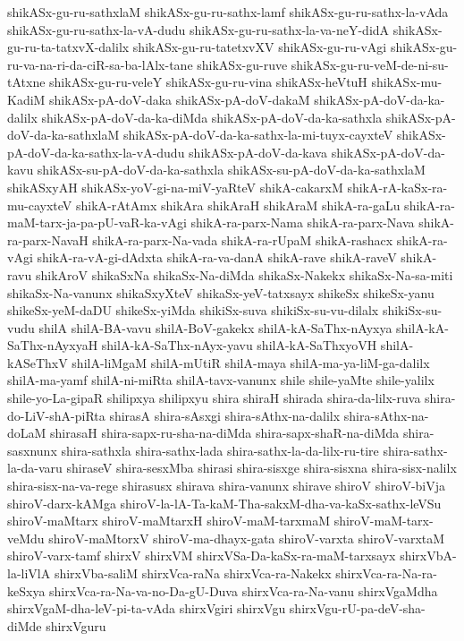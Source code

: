 {shikASx-gu-ru-sathxlaM
shikASx-gu-ru-sathx-lamf
shikASx-gu-ru-sathx-la-vAda
shikASx-gu-ru-sathx-la-vA-dudu
shikASx-gu-ru-sathx-la-va-neY-didA
shikASx-gu-ru-ta-tatxvX-dalilx
shikASx-gu-ru-tatetxvXV
shikASx-gu-ru-vAgi
shikASx-gu-ru-va-na-ri-da-ciR-sa-ba-lAlx-tane
shikASx-gu-ruve
shikASx-gu-ru-veM-de-ni-su-tAtxne
shikASx-gu-ru-veleY
shikASx-gu-ru-vina
shikASx-heVtuH
shikASx-mu-KadiM
shikASx-pA-doV-daka
shikASx-pA-doV-dakaM
shikASx-pA-doV-da-ka-dalilx
shikASx-pA-doV-da-ka-diMda
shikASx-pA-doV-da-ka-sathxla
shikASx-pA-doV-da-ka-sathxlaM
shikASx-pA-doV-da-ka-sathx-la-mi-tuyx-cayxteV
shikASx-pA-doV-da-ka-sathx-la-vA-dudu
shikASx-pA-doV-da-kava
shikASx-pA-doV-da-kavu
shikASx-su-pA-doV-da-ka-sathxla
shikASx-su-pA-doV-da-ka-sathxlaM
shikASxyAH
shikASx-yoV-gi-na-miV-yaRteV
shikA-cakarxM
shikA-rA-kaSx-ra-mu-cayxteV
shikA-rAtAmx
shikAra
shikAraH
shikAraM
shikA-ra-gaLu
shikA-ra-maM-tarx-ja-pa-pU-vaR-ka-vAgi
shikA-ra-parx-Nama
shikA-ra-parx-Nava
shikA-ra-parx-NavaH
shikA-ra-parx-Na-vada
shikA-ra-rUpaM
shikA-rashacx
shikA-ra-vAgi
shikA-ra-vA-gi-dAdxta
shikA-ra-va-danA
shikA-rave
shikA-raveV
shikA-ravu
shikAroV
shikaSxNa
shikaSx-Na-diMda
shikaSx-Nakekx
shikaSx-Na-sa-miti
shikaSx-Na-vanunx
shikaSxyXteV
shikaSx-yeV-tatxsayx
shikeSx
shikeSx-yanu
shikeSx-yeM-daDU
shikeSx-yiMda
shikiSx-suva
shikiSx-su-vu-dilalx
shikiSx-su-vudu
shilA
shilA-BA-vavu
shilA-BoV-gakekx
shilA-kA-SaThx-nAyxya
shilA-kA-SaThx-nAyxyaH
shilA-kA-SaThx-nAyx-yavu
shilA-kA-SaThxyoVH
shilA-kASeThxV
shilA-liMgaM
shilA-mUtiR
shilA-maya
shilA-ma-ya-liM-ga-dalilx
shilA-ma-yamf
shilA-ni-miRta
shilA-tavx-vanunx
shile
shile-yaMte
shile-yalilx
shile-yo-La-gipaR
shilipxya
shilipxyu
shira
shiraH
shirada
shira-da-lilx-ruva
shira-do-LiV-shA-piRta
shirasA
shira-sAsxgi
shira-sAthx-na-dalilx
shira-sAthx-na-doLaM
shirasaH
shira-sapx-ru-sha-na-diMda
shira-sapx-shaR-na-diMda
shira-sasxnunx
shira-sathxla
shira-sathx-lada
shira-sathx-la-da-lilx-ru-tire
shira-sathx-la-da-varu
shiraseV
shira-sesxMba
shirasi
shira-sisxge
shira-sisxna
shira-sisx-nalilx
shira-sisx-na-va-rege
shirasusx
shirava
shira-vanunx
shirave
shiroV
shiroV-biVja
shiroV-darx-kAMga
shiroV-la-lA-Ta-kaM-Tha-sakxM-dha-va-kaSx-sathx-leVSu
shiroV-maMtarx
shiroV-maMtarxH
shiroV-maM-tarxmaM
shiroV-maM-tarx-veMdu
shiroV-maMtorxV
shiroV-ma-dhayx-gata
shiroV-varxta
shiroV-varxtaM
shiroV-varx-tamf
shirxV
shirxVM
shirxVSa-Da-kaSx-ra-maM-tarxsayx
shirxVbA-la-liVlA
shirxVba-saliM
shirxVca-raNa
shirxVca-ra-Nakekx
shirxVca-ra-Na-ra-keSxya
shirxVca-ra-Na-va-no-Da-gU-Duva
shirxVca-ra-Na-vanu
shirxVgaMdha
shirxVgaM-dha-leV-pi-ta-vAda
shirxVgiri
shirxVgu
shirxVgu-rU-pa-deV-sha-diMde
shirxVguru
}
